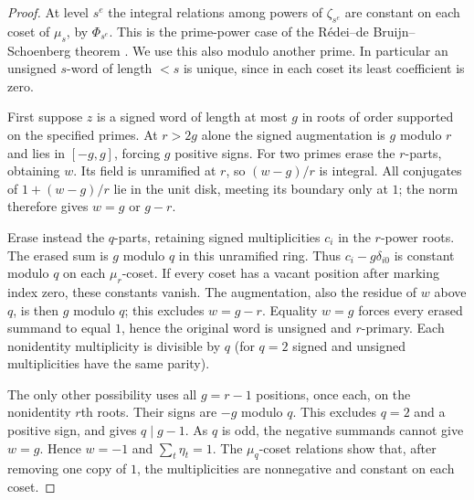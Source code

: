 \documentclass[11pt,a4paper]{article}
\numberwithin{equation}{section}
\theoremstyle{remark}
\begin{document}
\begin{proof}
At level $s^e$ the integral relations among powers of $\zeta_{s^e}$ are constant on each coset of $\mu_s$, by $\Phi_{s^e}$. This is the prime-power case of the R\'edei--de Bruijn--Schoenberg theorem \cite[Theorem~5.1]{Malikiosis}. We use this also modulo another prime. In particular an unsigned $s$-word of length $<s$ is unique, since in each coset its least coefficient is zero.

First suppose $z$ is a signed word of length at most $g$ in roots of order supported on the specified primes. At $r>2g$ alone the signed augmentation is $g$ modulo $r$ and lies in $[-g,g]$, forcing $g$ positive signs. For two primes erase the $r$-parts, obtaining $w$. Its field is unramified at $r$, so $(w-g)/r$ is integral. All conjugates of $1+(w-g)/r$ lie in the unit disk, meeting its boundary only at $1$; the norm therefore gives $w=g$ or $g-r$.

Erase instead the $q$-parts, retaining signed multiplicities $c_i$ in the $r$-power roots. The erased sum is $g$ modulo $q$ in this unramified ring. Thus $c_i-g\delta_{i0}$ is constant modulo $q$ on each $\mu_r$-coset. If every coset has a vacant position after marking index zero, these constants vanish. The augmentation, also the residue of $w$ above $q$, is then $g$ modulo $q$; this excludes $w=g-r$. Equality $w=g$ forces every erased summand to equal $1$, hence the original word is unsigned and $r$-primary. Each nonidentity multiplicity is divisible by $q$ (for $q=2$ signed and unsigned multiplicities have the same parity).

The only other possibility uses all $g=r-1$ positions, once each, on the nonidentity $r$th roots. Their signs are $-g$ modulo $q$. This excludes $q=2$ and a positive sign, and gives $q\mid g-1$. As $q$ is odd, the negative summands cannot give $w=g$. Hence $w=-1$ and $\sum_t\eta_t=1$. The $\mu_q$-coset relations show that, after removing one copy of $1$, the multiplicities are nonnegative and constant on each coset.


\end{proof}
\end{document}
